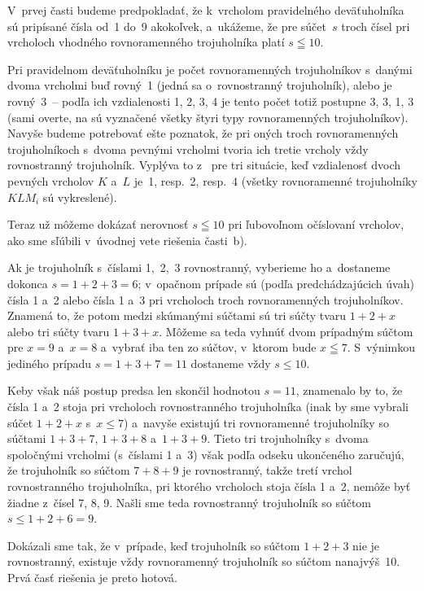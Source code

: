 {V~prvej časti budeme predpokladať, že k~vrcholom pravidelného
deväťuholníka sú pripísané čísla od~1 do~9 akokoľvek, a~ukážeme,
že pre súčet~$s$ troch čísel pri vrcholoch vhodného rovnoramenného
trojuholníka platí $s\leqq10$.
%

Pri pravidelnom deväťuholníku je počet rovnoramenných trojuholníkov
s~danými dvoma vrcholmi buď rovný~1 (jedná sa o~rovnostranný trojuholník),
alebo je rovný~3~-- podľa ich vzdialenosti 1, 2, 3, 4 je tento počet totiž postupne 3, 3, 1, 3
(sami overte, na \obr{} sú vyznačené všetky štyri typy rovnoramenných trojuholníkov).
Navyše budeme potrebovať ešte
poznatok, že pri oných troch rovnoramenných trojuholníkoch s~dvoma pevnými
vrcholmi tvoria ich tretie vrcholy vždy rovnostranný trojuholník.
Vyplýva to z~\obr{} pre tri situácie, keď vzdialenosť dvoch pevných
vrcholov $K$ a~$L$ je~1, resp.~2, resp.~4 (všetky rovnoramenné
trojuholníky $KLM_i$ sú vykreslené).
%

Teraz už môžeme dokázať nerovnosť $s\leqq10$ pri ľubovoľnom
očíslovaní vrcholov, ako sme sľúbili v~úvodnej vete riešenia časti~b).

Ak je trojuholník s~číslami 1,~2,~3 rovnostranný, vyberieme ho
a~dostaneme dokonca $s=1+2+3=6$; v~opačnom prípade sú
(podľa predchádzajúcich úvah) čísla 1 a~2
alebo čísla 1 a~3 pri vrcholoch troch rovnoramenných trojuholníkov.
Znamená to, že potom medzi skúmanými súčtami
sú tri súčty tvaru $1+2+x$ alebo tri súčty tvaru
$1+3+x$. Môžeme sa teda vyhnúť dvom prípadným
súčtom pre $x=9$ a~$x=8$ a~vybrať iba ten zo súčtov,
v~ktorom bude $x\leqq7$. S~výnimkou jediného prípadu $s=1+3+7=11$
dostaneme vždy $s\le10$.

Keby však náš postup predsa len skončil hodnotou $s=11$,
znamenalo by to, že čísla 1 a~2 stoja pri vrcholoch rovnostranného
trojuholníka (inak by sme vybrali súčet $1+2+x$ s~$x\le7$)
a~navyše existujú tri rovnoramenné trojuholníky so súčtami
$1+3+7$, $1+3+8$ a~$1+3+9$.
Tieto tri trojuholníky s~dvoma spoločnými vrcholmi (s~číslami 1 a~3) však
podľa odseku ukončeného  zaručujú, že
trojuholník so súčtom ${7+8+9}$ je rovnostranný, takže tretí vrchol
rovnostranného trojuholníka, pri ktorého vrcholoch stoja čísla 1 a~2, nemôže byť
žiadne z~čísel 7, 8, 9. Našli sme teda rovnostranný trojuholník so súčtom
$s\le1+2+6=9$.

Dokázali sme tak, že v~prípade, keď trojuholník
so súčtom $1+2+3$ nie je rovnostranný, existuje vždy
rovnoramenný trojuholník so súčtom nanajvýš~10. Prvá časť riešenia je
preto hotová.

}
